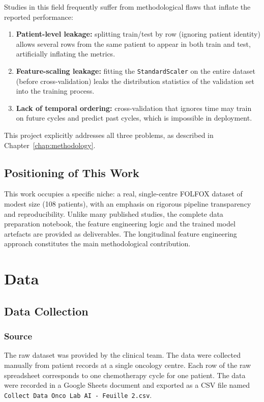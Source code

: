 \documentclass[12pt,a4paper]{report}
\begin{document}
Studies in this field frequently suffer from methodological flaws that inflate the reported performance:
\begin{enumerate}
  \item \textbf{Patient-level leakage:} splitting train/test by row (ignoring patient identity) allows several rows from the same patient to appear in both train and test, artificially inflating the metrics.
  \item \textbf{Feature-scaling leakage:} fitting the \texttt{StandardScaler} on the entire dataset (before cross-validation) leaks the distribution statistics of the validation set into the training process.
  \item \textbf{Lack of temporal ordering:} cross-validation that ignores time may train on future cycles and predict past cycles, which is impossible in deployment.
\end{enumerate}

This project explicitly addresses all three problems, as described in Chapter~\ref{chap:methodology}.

\section{Positioning of This Work}

This work occupies a specific niche: a real, single-centre FOLFOX dataset of modest size (108 patients), with an emphasis on rigorous pipeline transparency and reproducibility. Unlike many published studies, the complete data preparation notebook, the feature engineering logic and the trained model artefacts are provided as deliverables. The longitudinal feature engineering approach constitutes the main methodological contribution.

\chapter{Data}
\label{chap:data}

\section{Data Collection}

\subsection{Source}
The raw dataset was provided by the clinical team. The data were collected manually from patient records at a single oncology centre. Each row of the raw spreadsheet corresponds to one chemotherapy cycle for one patient. The data were recorded in a Google Sheets document and exported as a CSV file named \texttt{Collect Data Onco Lab AI - Feuille 2.csv}.
\end{document}
